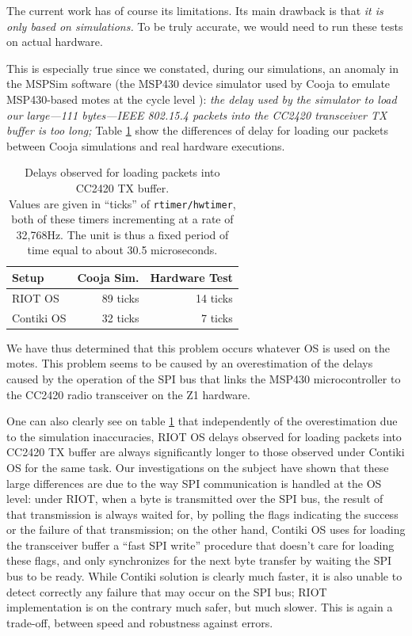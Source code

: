 \documentclass[conference]{IEEEtran}
\begin{document}
The current work has of course its limitations. Its main drawback is that
\emph{it is only based on simulations.} To be truly accurate, we would need
to run these tests on actual hardware.

This is especially true since we constated, during our simulations,
an anomaly in the MSPSim software (the MSP430 device simulator used by Cooja
to emulate MSP430-based motes at the cycle level \cite{MSPSim}):
\emph{the delay used by the simulator to load our large---111 bytes---IEEE
802.15.4 packets into the CC2420 transceiver TX buffer is too long;} Table
\ref{TblTXPktLoadDelays} show the differences of delay for loading
our packets between Cooja simulations and real hardware executions.

\begin{table}
\centering
\begin{tabular}{|l|r|r|}
\hline
Setup     &  Cooja Sim.  & Hardware Test \\
\hline
RIOT OS    &   89 ticks  &  14 ticks \\ 
Contiki OS &   32 ticks  &   7 ticks \\
\hline
\end{tabular}
\caption{Delays observed for loading packets into CC2420 TX buffer.\\
Values are given in ``ticks'' of \texttt{rtimer/hwtimer}, both of these
timers incrementing at a rate of 32,768Hz. The unit is thus a fixed period
of time equal to about 30.5 microseconds.}
\label{TblTXPktLoadDelays}
\end{table}

We have thus determined that this problem occurs whatever OS is used
on the motes. This problem seems to be caused by an overestimation
of the delays caused by the operation of the SPI bus that links
the MSP430 microcontroller to the CC2420 radio transceiver
on the Z1 hardware.

One can also clearly see on table \ref{TblTXPktLoadDelays} that independently
of the overestimation due to the simulation inaccuracies, RIOT OS delays
observed for loading packets into CC2420 TX buffer are always significantly
longer to those observed under Contiki OS for the same task.
Our investigations on the subject have shown that these large differences
are due to the way SPI communication is handled at the OS level: under RIOT,
when a byte is transmitted over the SPI bus, the result of that transmission
is always waited for, by polling the flags indicating the success or the
failure of that transmission; on the other hand, Contiki OS uses for loading
the transceiver buffer a ``fast SPI write'' procedure that doesn't care for
loading these flags, and only synchronizes for the next byte transfer by
waiting the SPI bus to be ready. While Contiki solution is clearly much
faster, it is also unable to detect correctly any failure that may occur
on the SPI bus; RIOT implementation is on the contrary much safer, but
much slower. This is again a trade-off, between speed and robustness
against errors.
\end{document}
